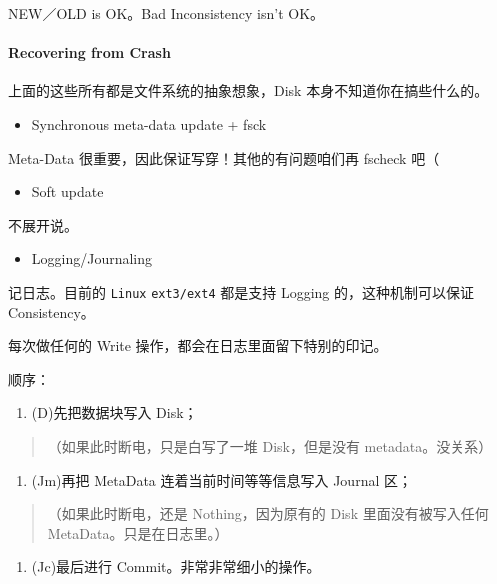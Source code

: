 \documentclass[
]{article}
\begin{document}
NEW／OLD is OK。Bad Inconsistency isn't OK。

\hypertarget{header-n182}{%
\paragraph{Recovering from Crash}\label{header-n182}}

上面的这些所有都是文件系统的抽象想象，Disk 本身不知道你在搞些什么的。

\begin{itemize}
\item
  Synchronous meta-data update + fsck
\end{itemize}

Meta-Data 很重要，因此保证写穿！其他的有问题咱们再 fscheck 吧（

\begin{itemize}
\item
  Soft update
\end{itemize}

不展开说。

\begin{itemize}
\item
  Logging/Journaling
\end{itemize}

记日志。目前的 \texttt{Linux} \texttt{ext3/ext4} 都是支持 Logging
的，这种机制可以保证 Consistency。

每次做任何的 Write 操作，都会在日志里面留下特别的印记。

顺序：

\begin{enumerate}
\def\labelenumi{\arabic{enumi}.}
\item
  (D)先把数据块写入 Disk；
\end{enumerate}

\begin{quote}
（如果此时断电，只是白写了一堆 Disk，但是没有 metadata。没关系）
\end{quote}

\begin{enumerate}
\def\labelenumi{\arabic{enumi}.}
\item
  (Jm)再把 MetaData 连着当前时间等等信息写入 Journal 区；
\end{enumerate}

\begin{quote}
（如果此时断电，还是 Nothing，因为原有的 Disk 里面没有被写入任何
MetaData。只是在日志里。）
\end{quote}

\begin{enumerate}
\def\labelenumi{\arabic{enumi}.}
\item
  (Jc)最后进行 Commit。非常非常细小的操作。
\end{enumerate}
\end{document}
